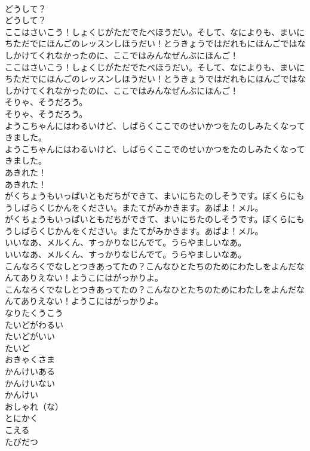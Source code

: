 \documentclass[8pt]{extreport}
\begin{document}
\begin{CJK}{UTF8}{min}
\\	どうして？	
\\	どうして？ 
\\	ここはさいこう！しょくじがただでたべほうだい。そして、なによりも、まいにちただでにほんごのレッスンしほうだい！とうきょうではだれもにほんごではなしかけてくれなかったのに、ここではみんなぜんぶにほんご！	
\\	ここはさいこう！しょくじがただでたべほうだい。そして、なによりも、まいにちただでにほんごのレッスンしほうだい！とうきょうではだれもにほんごではなしかけてくれなかったのに、ここではみんなぜんぶにほんご！ 
\\	そりゃ、そうだろう。	
\\	そりゃ、そうだろう。 
\\	ようこちゃんにはわるいけど、しばらくここでのせいかつをたのしみたくなってきました。	
\\	ようこちゃんにはわるいけど、しばらくここでのせいかつをたのしみたくなってきました。 
\\	あきれた！	
\\	あきれた！ 
\\	がくちょうもいっぱいともだちができて、まいにちたのしそうです。ぼくらにもうしばらくじかんをください。またてがみかきます。あばよ！メル。	
\\	がくちょうもいっぱいともだちができて、まいにちたのしそうです。ぼくらにもうしばらくじかんをください。またてがみかきます。あばよ！メル。 
\\	いいなあ、メルくん、すっかりなじんでて。うらやましいなあ。	
\\	いいなあ、メルくん、すっかりなじんでて。うらやましいなあ。 
\\	こんなろくでなしとつきあってたの？こんなひとたちのためにわたしをよんだなんてありえない！ようこにはがっかりよ。	
\\	こんなろくでなしとつきあってたの？こんなひとたちのためにわたしをよんだなんてありえない！ようこにはがっかりよ。 
\\	なりたくうこう
\\	たいどがわるい
\\	たいどがいい
\\	たいど
\\	おきゃくさま
\\	かんけいある
\\	かんけいない
\\	かんけい
\\	おしゃれ（な）
\\	とにかく
\\	こえる
\\	たびだつ

\end{CJK}
\end{document}
